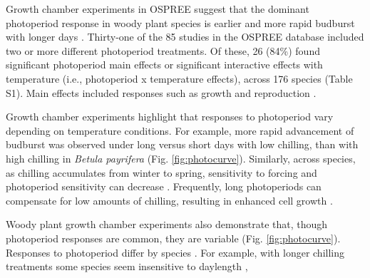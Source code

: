 \documentclass{article}
\begin{document}
\par Growth chamber experiments in OSPREE suggest that the dominant photoperiod response in woody plant species is earlier and more rapid budburst with longer days \citep [e.g., ][]{Caffarra:2011a}. Thirty-one of the 85 studies in the OSPREE database included two or more different photoperiod treatments. Of these, 26 (84\%) found significant photoperiod main effects or significant interactive effects with temperature (i.e., photoperiod x temperature effects), across 176 species (Table S1). Main effects included responses such as growth \citep[e.g., higher growth rates with longer days][]{Ashby:1962aa} and reproduction \citep[e.g., increased flowering with longer days][]{Heide:2012aa}. 


\par Growth chamber experiments highlight that responses to photoperiod vary depending on temperature conditions. For example, more rapid advancement of budburst was observed under long versus short days with low chilling, than with high chilling in \emph{Betula payrifera} \citep{Hawkins:2012} (Fig. \ref{fig:photocurve}). Similarly, across species, as chilling accumulates from winter to spring, sensitivity to forcing and photoperiod sensitivity can decrease \citep{malyshev2018}. Frequently, long photoperiods can compensate for low amounts of chilling, resulting in enhanced cell growth \citep{Caffarra:2011b,Myking:1995,Heide:1993}.%
\par Woody plant growth chamber experiments also demonstrate that, though photoperiod responses are common, they are variable (Fig. \ref{fig:photocurve}). Responses to photoperiod differ by species \citep[e.g.,][]{flynn2018,zohner2016,Basler:2014aa,Basler:2012,Howe:1996,Heide:1993a}.
For example, with longer chilling treatments some species seem insensitive to daylength \citep[e.g., \emph{Hammamelis} spp., \emph{Prunus} spp.,][]{zohner2016}, %
\end{document}
